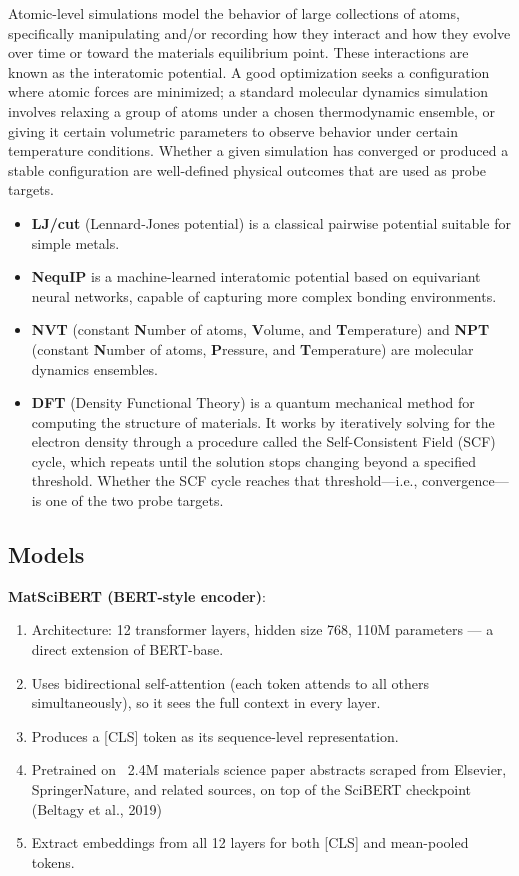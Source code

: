 \documentclass[11pt]{article}
\begin{document}
Atomic-level simulations model the behavior of large collections of atoms, specifically manipulating and/or recording how they interact and how they evolve over time or toward the materials equilibrium point. These interactions are known as the interatomic potential. A good optimization seeks a configuration where atomic forces are minimized; a standard molecular dynamics simulation involves relaxing a group of atoms under a chosen thermodynamic ensemble, or giving it certain volumetric parameters to observe behavior under certain temperature conditions. Whether a given simulation has converged or produced a stable configuration are well-defined physical outcomes that are used as probe targets.

\begin{itemize}
    \item \textbf{LJ/cut} (Lennard-Jones potential) is a classical pairwise potential suitable for simple metals.
    \item \textbf{NequIP} is a machine-learned interatomic potential based on equivariant neural networks, capable of capturing more complex bonding environments.
    \item \textbf{NVT} (constant \textbf{N}umber of atoms, \textbf{V}olume, and \textbf{T}emperature) and \textbf{NPT} (constant \textbf{N}umber of atoms, \textbf{P}ressure, and \textbf{T}emperature) are molecular dynamics ensembles.
    \item \textbf{DFT} (Density Functional Theory) is a quantum mechanical method for computing the structure of materials. It works by iteratively solving for the electron density through a procedure called the Self-Consistent Field (SCF) cycle, which repeats until the solution stops changing beyond a specified threshold. Whether the SCF cycle reaches that threshold---i.e., convergence---is one of the two probe targets.
\end{itemize}

\subsection{Models}
\textbf{MatSciBERT (BERT-style encoder)}:
\begin{enumerate}
    \item Architecture: 12 transformer layers, hidden size 768, 110M parameters — a direct extension of BERT-base.
    \item Uses bidirectional self-attention (each token attends to all others simultaneously), so it sees the full context in every layer.
    \item Produces a [CLS] token as its sequence-level representation.
    \item Pretrained on ~2.4M materials science paper abstracts scraped from Elsevier, SpringerNature, and related sources, on top of the SciBERT checkpoint (Beltagy et al., 2019) \cite{beltagy2019}
    \item Extract embeddings from all 12 layers for both [CLS] and mean-pooled tokens.
\end{enumerate}
\end{document}
